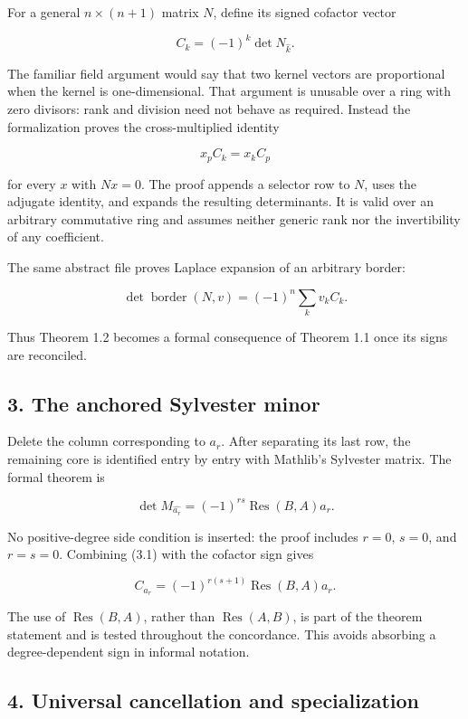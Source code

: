 \documentclass[
  11pt,
  a4paper,
]{article}
\begin{document}
For a general \(n\times(n+1)\) matrix \(N\), define its signed cofactor
vector

\[
C_k=(-1)^k\det N_{\widehat k}.
\]

The familiar field argument would say that two kernel vectors are
proportional when the kernel is one-dimensional. That argument is
unusable over a ring with zero divisors: rank and division need not
behave as required. Instead the formalization proves the
cross-multiplied identity

\[
x_pC_k=x_kC_p
\tag{2.2}
\]

for every \(x\) with \(Nx=0\). The proof appends a selector row to
\(N\), uses the adjugate identity, and expands the resulting
determinants. It is valid over an arbitrary commutative ring and assumes
neither generic rank nor the invertibility of any coefficient.

The same abstract file proves Laplace expansion of an arbitrary border:

\[
\det\operatorname{border}(N,v)=(-1)^n\sum_kv_kC_k.
\tag{2.3}
\]

Thus Theorem 1.2 becomes a formal consequence of Theorem 1.1 once its
signs are reconciled.

\subsection{3. The anchored Sylvester
minor}\label{the-anchored-sylvester-minor}

Delete the column corresponding to \(a_r\). After separating its last
row, the remaining core is identified entry by entry with Mathlib's
Sylvester matrix. The formal theorem is

\[
\det M_{\widehat{a_r}}
=(-1)^{rs}\operatorname{Res}(B,A)a_r.
\tag{3.1}
\]

No positive-degree side condition is inserted: the proof includes
\(r=0\), \(s=0\), and \(r=s=0\). Combining (3.1) with the cofactor sign
gives

\[
C_{a_r}=(-1)^{r(s+1)}\operatorname{Res}(B,A)a_r.
\tag{3.2}
\]

The use of \(\operatorname{Res}(B,A)\), rather than
\(\operatorname{Res}(A,B)\), is part of the theorem statement and is
tested throughout the concordance. This avoids absorbing a
degree-dependent sign in informal notation.

\subsection{4. Universal cancellation and
specialization}\label{universal-cancellation-and-specialization}
\end{document}
